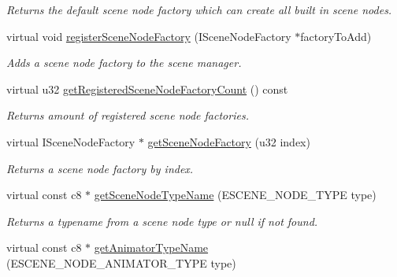 \begin{DoxyCompactItemize}
\begin{DoxyCompactList}\small\item\em Returns the default scene node factory which can create all built in scene nodes. \end{DoxyCompactList}\item 
virtual void \hyperlink{classirr_1_1scene_1_1_c_scene_manager_a2e04c241d92ec1efc20386b47f77f5cc}{register\-Scene\-Node\-Factory} (I\-Scene\-Node\-Factory $\ast$factory\-To\-Add)
\begin{DoxyCompactList}\small\item\em Adds a scene node factory to the scene manager. \end{DoxyCompactList}\item 
\hypertarget{classirr_1_1scene_1_1_c_scene_manager_a203d9023ca96c760d65214bb4a6a022e}{virtual u32 \hyperlink{classirr_1_1scene_1_1_c_scene_manager_a203d9023ca96c760d65214bb4a6a022e}{get\-Registered\-Scene\-Node\-Factory\-Count} () const }\label{classirr_1_1scene_1_1_c_scene_manager_a203d9023ca96c760d65214bb4a6a022e}

\begin{DoxyCompactList}\small\item\em Returns amount of registered scene node factories. \end{DoxyCompactList}\item 
\hypertarget{classirr_1_1scene_1_1_c_scene_manager_a3cbd5e8f80253feccd9d949bf29f7981}{virtual I\-Scene\-Node\-Factory $\ast$ \hyperlink{classirr_1_1scene_1_1_c_scene_manager_a3cbd5e8f80253feccd9d949bf29f7981}{get\-Scene\-Node\-Factory} (u32 index)}\label{classirr_1_1scene_1_1_c_scene_manager_a3cbd5e8f80253feccd9d949bf29f7981}

\begin{DoxyCompactList}\small\item\em Returns a scene node factory by index. \end{DoxyCompactList}\item 
\hypertarget{classirr_1_1scene_1_1_c_scene_manager_a121ed5e70210d2861a56b941170f9011}{virtual const c8 $\ast$ \hyperlink{classirr_1_1scene_1_1_c_scene_manager_a121ed5e70210d2861a56b941170f9011}{get\-Scene\-Node\-Type\-Name} (E\-S\-C\-E\-N\-E\-\_\-\-N\-O\-D\-E\-\_\-\-T\-Y\-P\-E type)}\label{classirr_1_1scene_1_1_c_scene_manager_a121ed5e70210d2861a56b941170f9011}

\begin{DoxyCompactList}\small\item\em Returns a typename from a scene node type or null if not found. \end{DoxyCompactList}\item 
\hypertarget{classirr_1_1scene_1_1_c_scene_manager_adf075f8278a07a80a241295faff41f15}{virtual const c8 $\ast$ \hyperlink{classirr_1_1scene_1_1_c_scene_manager_adf075f8278a07a80a241295faff41f15}{get\-Animator\-Type\-Name} (E\-S\-C\-E\-N\-E\-\_\-\-N\-O\-D\-E\-\_\-\-A\-N\-I\-M\-A\-T\-O\-R\-\_\-\-T\-Y\-P\-E type)}\label{classirr_1_1scene_1_1_c_scene_manager_adf075f8278a07a80a241295faff41f15}


\end{DoxyCompactItemize}
